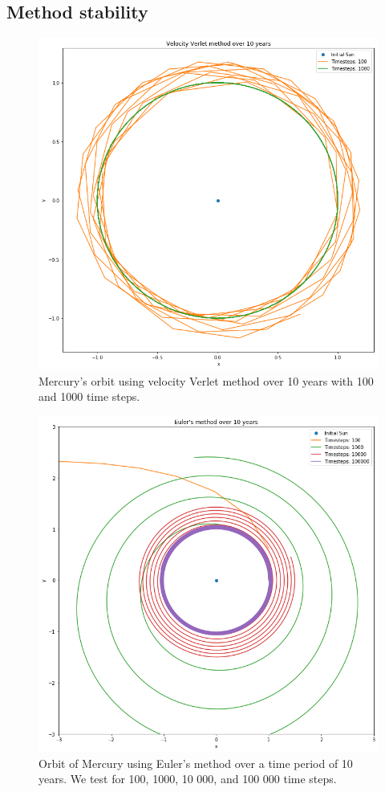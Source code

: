 \documentclass[a4paper, fontsize=11pt]{article}
\begin{document}
\subsection{Method stability} 



\begin{figure}[H]
\includegraphics[scale=0.4]{plots/velocityverlet}
\caption{Mercury's orbit using velocity Verlet method over 10 years with 100 and 1000 time steps.}
\label{fig:Verlet}
\end{figure}

\begin{figure}[H]
\includegraphics[scale=0.4]{plots/euler}
\caption{Orbit of Mercury using Euler's method over a time period of 10 years. We test for 100, 1000, 10 000, and 100 000 time steps.}
\label{fig:Euler}
\end{figure}
\end{document}
